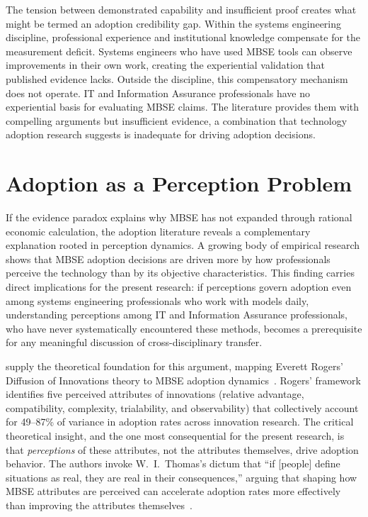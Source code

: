 The tension between demonstrated capability and insufficient proof creates what might be termed an adoption credibility gap. Within the systems engineering discipline, professional experience and institutional knowledge compensate for the measurement deficit. Systems engineers who have used MBSE tools can observe improvements in their own work, creating the experiential validation that published evidence lacks. Outside the discipline, this compensatory mechanism does not operate. IT and Information Assurance professionals have no experiential basis for evaluating MBSE claims. The literature provides them with compelling arguments but insufficient evidence, a combination that technology adoption research suggests is inadequate for driving adoption decisions.

\section{Adoption as a Perception Problem}

If the evidence paradox explains why MBSE has not expanded through rational economic calculation, the adoption literature reveals a complementary explanation rooted in perception dynamics. A growing body of empirical research shows that MBSE adoption decisions are driven more by how professionals perceive the technology than by its objective characteristics. This finding carries direct implications for the present research: if perceptions govern adoption even among systems engineering professionals who work with models daily, understanding perceptions among IT and Information Assurance professionals, who have never systematically encountered these methods, becomes a prerequisite for any meaningful discussion of cross-disciplinary transfer.

\citeauthor{Call_Herber_2022} supply the theoretical foundation for this argument, mapping Everett Rogers' Diffusion of Innovations theory to MBSE adoption dynamics~\parencite{Call_Herber_2022}. Rogers' framework identifies five perceived attributes of innovations (relative advantage, compatibility, complexity, trialability, and observability) that collectively account for 49--87\% of variance in adoption rates across innovation research. The critical theoretical insight, and the one most consequential for the present research, is that \textit{perceptions} of these attributes, not the attributes themselves, drive adoption behavior. The authors invoke W.~I.~Thomas's dictum that ``if [people] define situations as real, they are real in their consequences,'' arguing that shaping how MBSE attributes are perceived can accelerate adoption rates more effectively than improving the attributes themselves~\parencite{Call_Herber_2022}.


